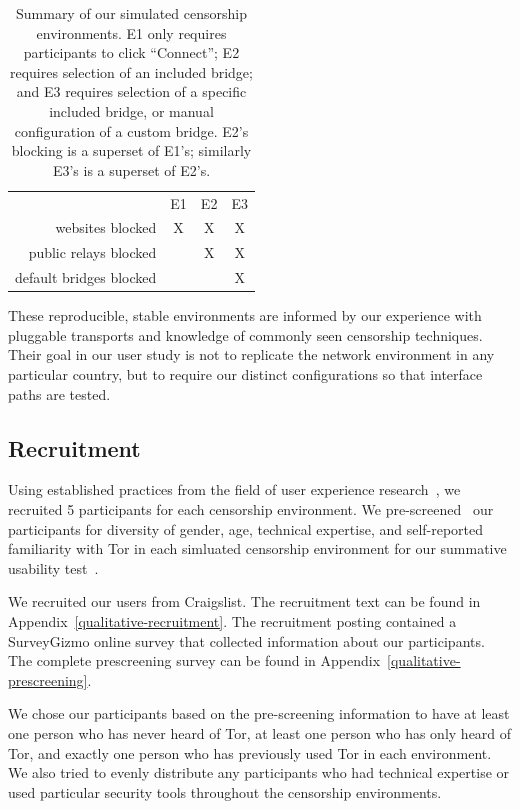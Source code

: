 \documentclass[USenglish,oneside,twocolumn]{article}
\begin{document}
\begin{table}
\centering
\begin{tabular}{r c c c}
& E1 & E2 & E3 \\
websites blocked & X & X & X \\
public relays blocked & & X & X \\
default bridges blocked & & & X \\
\end{tabular}
\caption{
Summary of our simulated censorship environments.
E1 only requires participants to click ``Connect'';
E2 requires selection of an included bridge;
and E3 requires selection of a specific included bridge,
or manual configuration of a custom bridge.
E2's blocking is a superset of E1's;
similarly E3's is a superset of E2's.
}
\label{tab:environments}
\end{table}

These reproducible, stable environments are informed by our experience 
with pluggable transports and knowledge of commonly seen censorship 
techniques. Their goal in our user study is not to replicate the network 
environment in any particular country, but to require our distinct configurations
so that interface paths are tested.

\subsection{Recruitment}
Using established practices from the field of user experience research~\cite{howmanyusers},
we recruited 5 participants for each censorship environment.
We pre-screened~\cite{screening} our participants for diversity of gender, age, technical expertise,
and self-reported familiarity with Tor in each simluated censorship environment for our summative
usability test~\cite{summative}. 

We recruited our users from Craigslist. The recruitment text can be found in 
Appendix~\ref{qualitative-recruitment}. The recruitment posting contained a 
SurveyGizmo online survey that collected information about our participants.
The complete prescreening survey can be found in Appendix~\ref{qualitative-prescreening}.  

We chose our participants based on the pre-screening information to have 
at least one person who has never heard of Tor, at least one person who has 
only heard of Tor, and exactly one person who has previously used Tor in each
environment. We also tried to evenly distribute any participants who had technical
expertise or used particular security tools throughout the censorship environments. 
\end{document}
